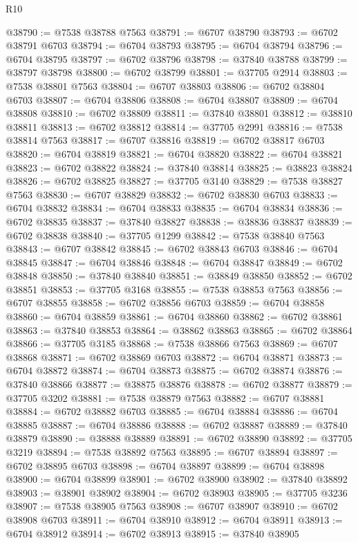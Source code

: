 \begin{lexlean}{R10}
\begin{coremodule}
@38790 := @7538 @38788 @7563
@38791 := @6707 @38790
@38793 := @6702 @38791 @6703
@38794 := @6704 @38793
@38795 := @6704 @38794
@38796 := @6704 @38795
@38797 := @6702 @38796
@38798 := @37840 @38788
@38799 := @38797 @38798
@38800 := @6702 @38799
@38801 := @37705 @2914
@38803 := @7538 @38801 @7563
@38804 := @6707 @38803
@38806 := @6702 @38804 @6703
@38807 := @6704 @38806
@38808 := @6704 @38807
@38809 := @6704 @38808
@38810 := @6702 @38809
@38811 := @37840 @38801
@38812 := @38810 @38811
@38813 := @6702 @38812
@38814 := @37705 @2991
@38816 := @7538 @38814 @7563
@38817 := @6707 @38816
@38819 := @6702 @38817 @6703
@38820 := @6704 @38819
@38821 := @6704 @38820
@38822 := @6704 @38821
@38823 := @6702 @38822
@38824 := @37840 @38814
@38825 := @38823 @38824
@38826 := @6702 @38825
@38827 := @37705 @3140
@38829 := @7538 @38827 @7563
@38830 := @6707 @38829
@38832 := @6702 @38830 @6703
@38833 := @6704 @38832
@38834 := @6704 @38833
@38835 := @6704 @38834
@38836 := @6702 @38835
@38837 := @37840 @38827
@38838 := @38836 @38837
@38839 := @6702 @38838
@38840 := @37705 @1299
@38842 := @7538 @38840 @7563
@38843 := @6707 @38842
@38845 := @6702 @38843 @6703
@38846 := @6704 @38845
@38847 := @6704 @38846
@38848 := @6704 @38847
@38849 := @6702 @38848
@38850 := @37840 @38840
@38851 := @38849 @38850
@38852 := @6702 @38851
@38853 := @37705 @3168
@38855 := @7538 @38853 @7563
@38856 := @6707 @38855
@38858 := @6702 @38856 @6703
@38859 := @6704 @38858
@38860 := @6704 @38859
@38861 := @6704 @38860
@38862 := @6702 @38861
@38863 := @37840 @38853
@38864 := @38862 @38863
@38865 := @6702 @38864
@38866 := @37705 @3185
@38868 := @7538 @38866 @7563
@38869 := @6707 @38868
@38871 := @6702 @38869 @6703
@38872 := @6704 @38871
@38873 := @6704 @38872
@38874 := @6704 @38873
@38875 := @6702 @38874
@38876 := @37840 @38866
@38877 := @38875 @38876
@38878 := @6702 @38877
@38879 := @37705 @3202
@38881 := @7538 @38879 @7563
@38882 := @6707 @38881
@38884 := @6702 @38882 @6703
@38885 := @6704 @38884
@38886 := @6704 @38885
@38887 := @6704 @38886
@38888 := @6702 @38887
@38889 := @37840 @38879
@38890 := @38888 @38889
@38891 := @6702 @38890
@38892 := @37705 @3219
@38894 := @7538 @38892 @7563
@38895 := @6707 @38894
@38897 := @6702 @38895 @6703
@38898 := @6704 @38897
@38899 := @6704 @38898
@38900 := @6704 @38899
@38901 := @6702 @38900
@38902 := @37840 @38892
@38903 := @38901 @38902
@38904 := @6702 @38903
@38905 := @37705 @3236
@38907 := @7538 @38905 @7563
@38908 := @6707 @38907
@38910 := @6702 @38908 @6703
@38911 := @6704 @38910
@38912 := @6704 @38911
@38913 := @6704 @38912
@38914 := @6702 @38913
@38915 := @37840 @38905

\end{coremodule}
\end{lexlean}

